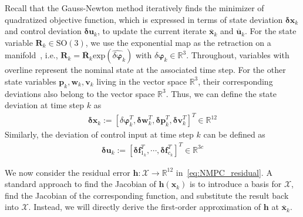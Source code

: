 Recall that the Gauss-Newton method iteratively finds the minimizer of quadratized objective function, which is expressed in terms of state deviation $\mathbf{\delta x}_{k}$ and control deviation $\mathbf{\delta u}_{k}$, to update the current iterate $\overline{\mathbf{x}}_k$ and $\overline{\mathbf{u}}_k$. 
For the state variable $\mathbf{R}_k \in \mathrm{SO}(3)$, we use the exponential map as the retraction on a manifold~\cite{absil2009optimization}, i.e., $\mathbf{R}_k = \overline{\mathbf{R}}_k \mathrm{exp}(\widehat{\delta \boldsymbol{\varphi}}_k)$ with $\delta \boldsymbol{\varphi}_{k} \in \mathbb{R}^3$. Throughout, variables with overline represent the nominal state at the associated time step. For the other state variables $\mathbf{p}_k, \mathbf{w}_k, \mathbf{v}_k$ living in the vector space $\mathbb{R}^3$, their corresponding deviations also belong to the vector space $\mathbb{R}^3$. Thus, we can define the state deviation at time step $k$ as 
\begin{align}
\label{eq:state_deviation}
\mathbf{\delta x}_{k}:= 
[{\delta\boldsymbol{\varphi}}_{k}^{T}, \mathbf{\delta w}_{k}^{T}, \mathbf{\delta p}_{k}^{T}, \mathbf{\delta v}_{k}^{T}]^{T} \in \mathbb{R}^{12}
\end{align}
Similarly, the deviation of control input at time step $k$ can be defined as
\begin{align}
\label{eq:control_deviation}
\mathbf{\delta u}_{k}:= 
{\left[ {\mathbf{\delta f}}^{T}_{1_k}, \cdots, {\mathbf{\delta f}}^{T}_{c_k} \right]}^T \in \mathbb{R}^{3c}
\end{align}


We now consider the residual error $\mathbf{h}:\mathcal{X} \rightarrow \mathbb{R}^{12}$ in~\eqref{eq:NMPC_residual}. A standard approach to find the Jacobian of $\mathbf{h}(\mathbf{x}_{k})$ is to introduce a basis for $\mathcal{X}$, find the Jacobian of the corresponding function, and substitute the result back into $\mathcal{X}$. Instead, we will directly derive the first-order approximation of $\mathbf{h}$ at $\overline{\mathbf{x}}_{k}$. 

